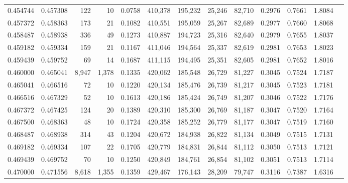 \begin{tabular}{rrrrrrrrrrrrr}
0.454744 & 0.457308 &    122 &    10 &                                     0.0758 & 410,378 & 195,232 &  25,246 &  82,710 & 0.2976 & 0.7661 & 1.8084 \\
0.457372 & 0.458363 &    173 &    21 &                                     0.1082 & 410,551 & 195,059 &  25,267 &  82,689 & 0.2977 & 0.7660 & 1.8068 \\
0.458487 & 0.458938 &    336 &    49 &                                     0.1273 & 410,887 & 194,723 &  25,316 &  82,640 & 0.2979 & 0.7655 & 1.8037 \\
0.459182 & 0.459334 &    159 &    21 &                                     0.1167 & 411,046 & 194,564 &  25,337 &  82,619 & 0.2981 & 0.7653 & 1.8023 \\
0.459439 & 0.459752 &     69 &    14 &                                     0.1687 & 411,115 & 194,495 &  25,351 &  82,605 & 0.2981 & 0.7652 & 1.8016 \\
0.460000 & 0.465041 &  8,947 & 1,378 &                                     0.1335 & 420,062 & 185,548 &  26,729 &  81,227 & 0.3045 & 0.7524 & 1.7187 \\
0.465041 & 0.466516 &     72 &    10 &                                     0.1220 & 420,134 & 185,476 &  26,739 &  81,217 & 0.3045 & 0.7523 & 1.7181 \\
0.466516 & 0.467329 &     52 &    10 &                                     0.1613 & 420,186 & 185,424 &  26,749 &  81,207 & 0.3046 & 0.7522 & 1.7176 \\
0.467372 & 0.467425 &    124 &    20 &                                     0.1389 & 420,310 & 185,300 &  26,769 &  81,187 & 0.3047 & 0.7520 & 1.7164 \\
0.467500 & 0.468363 &     48 &    10 &                                     0.1724 & 420,358 & 185,252 &  26,779 &  81,177 & 0.3047 & 0.7519 & 1.7160 \\
0.468487 & 0.468938 &    314 &    43 &                                     0.1204 & 420,672 & 184,938 &  26,822 &  81,134 & 0.3049 & 0.7515 & 1.7131 \\
0.469182 & 0.469334 &    107 &    22 &                                     0.1705 & 420,779 & 184,831 &  26,844 &  81,112 & 0.3050 & 0.7513 & 1.7121 \\
0.469439 & 0.469752 &     70 &    10 &                                     0.1250 & 420,849 & 184,761 &  26,854 &  81,102 & 0.3051 & 0.7513 & 1.7114 \\
0.470000 & 0.471556 &  8,618 & 1,355 &                                     0.1359 & 429,467 & 176,143 &  28,209 &  79,747 & 0.3116 & 0.7387 & 1.6316 \\

\end{tabular}
